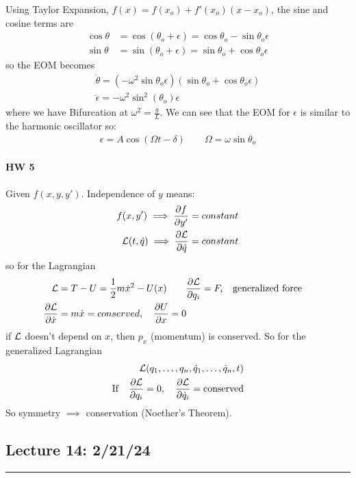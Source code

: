 \documentclass[../main.tex]{subfiles}
\begin{document}
Using Taylor Expansion, $f(x) = f(x_o) + f'(x_o) (x-x_o)$, the sine and cosine terms are
\begin{align*}
    \cos\theta &= \cos(\theta_o + \epsilon) = \cos\theta_o - \sin\theta_o \epsilon \\
    \sin\theta &= \sin(\theta_o + \epsilon) = \sin\theta_o + \cos\theta_o \epsilon
\end{align*}
so the EOM becomes
\begin{align*}
    \ddot \theta = (- \omega^2 \sin\theta_o \epsilon) (\sin\theta_o + \cos\theta_o \epsilon) \\
    \ddot \epsilon = -\omega^2 \sin^2(\theta_o) \epsilon
\end{align*}
where we have Bifurcation at $\omega^2 = \frac{g}{L}$. We can see that the EOM for $\epsilon$ is
similar to the harmonic oscillator so:
\begin{align*}
    \epsilon = A \cos(\Omega t - \delta) \qquad \Omega = \omega \sin\theta_o
\end{align*}
\paragraph*{HW 5} Given $f(x, y, y')$. Independence of $y$ means:
\begin{align*}
    f(x, y') \implies \pdv{f}{y'} = constant \\
    \mathcal{L}(t, \dot q) \implies \pdv{\mathcal{L}}{\dot q} = constant
\end{align*}
so for the Lagrangian
\begin{align*}
    \lagr &= T - U = \frac{1}{2} m \dot x^2 - U(x) \qquad \pdv{\lagr}{q_i} = F_i \qqtext{generalized force} \\
    \pdv{\lagr}{\dot x} &= m \dot x = conserved, \quad \pdv{U}{x} = 0
\end{align*}
if $\mathcal{L}$ doesn't depend on $x$, then $p_x$ (momentum) is conserved. So for the generalized 
Lagrangian
\begin{align*}
    \mathcal{L}(q_1, \dots, q_n, \dot q_1, \dots, \dot q_n, t) \\
    \mathrm{If} \quad \pdv{\mathcal{L}}{q_i} = 0, \quad  \pdv{\mathcal{L}}{\dot q_i} = \mathrm{conserved}
\end{align*}
So symmetry $\implies$ conservation (Noether's Theorem).

\newpage
\subsection*{Lecture 14: \hfill 2/21/24}
\hrule \vspace{10px}
\end{document}

